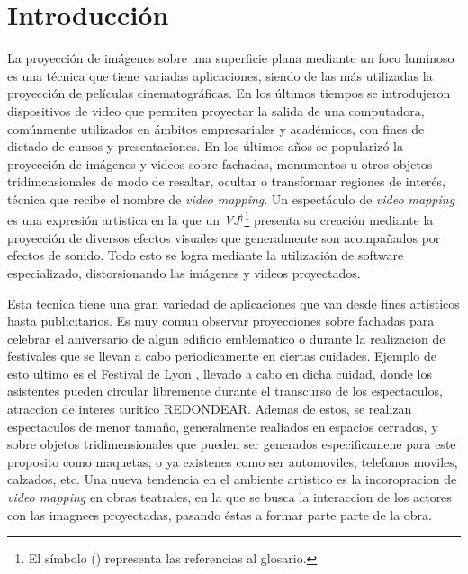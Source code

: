﻿\chapter{Introducción}


La proyección de imágenes sobre una superficie plana mediante un foco luminoso es una técnica que tiene variadas aplicaciones, siendo de las más utilizadas la proyección de películas cinematográficas. En los últimos tiempos se introdujeron dispositivos de video que permiten proyectar la salida de una computadora, comúnmente utilizados en ámbitos empresariales y académicos, con fines de dictado de cursos y presentaciones. En los últimos años se popularizó la proyección de imágenes y videos sobre fachadas, monumentos u otros objetos tridimensionales de modo de resaltar, ocultar o transformar regiones de interés, técnica que recibe el nombre de \emph{video mapping}.
Un espectáculo de \emph{video mapping} es una expresión artística en la que un \emph{VJ}$^\dagger$\footnote{El símbolo (\dag) representa las referencias al glosario.} presenta su creación mediante la proyección de diversos efectos visuales que generalmente son acompañados por efectos de sonido.
Todo esto se logra mediante la utilización de software especializado, distorsionando las imágenes y videos proyectados.




Esta tecnica tiene una gran variedad de aplicaciones que van desde fines artisticos hasta publicitarios. 
Es muy comun observar proyecciones sobre fachadas para celebrar el aniversario de algun edificio emblematico o durante la realizacion de festivales que se llevan a cabo periodicamente en ciertas cuidades. Ejemplo de esto ultimo es el Festival de Lyon \cite{FestivalLyon}, llevado a cabo en dicha cuidad, donde los asistentes pueden circular libremente durante el transcurso de los espectaculos, atraccion de interes turitico REDONDEAR. Ademas de estos, se realizan espectaculos de menor tamaño, generalmente realiados en espacios cerrados, y sobre objetos tridimensionales que pueden ser generados especificamene para este proposito como maquetas, o ya existenes como ser automoviles, telefonos moviles, calzados, etc. Una nueva tendencia en el ambiente artistico es la incoropracion de \emph{video mapping} en obras teatrales, en la que se busca la interaccion de los actores con las imagnees proyectadas, pasando éstas a formar parte parte de la obra.


